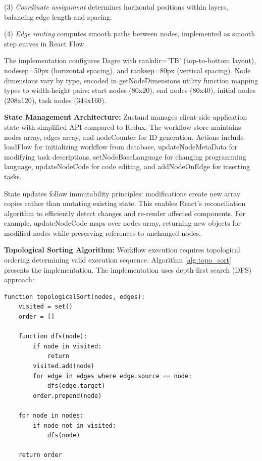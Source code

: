 \documentclass[12pt]{article}
\begin{document}
(3) \textit{Coordinate assignment} determines horizontal positions within layers, balancing edge length and spacing.

(4) \textit{Edge routing} computes smooth paths between nodes, implemented as smooth step curves in React Flow.

The implementation configures Dagre with rankdir='TB' (top-to-bottom layout), nodesep=50px (horizontal spacing), and ranksep=80px (vertical spacing). Node dimensions vary by type, encoded in getNodeDimensions utility function mapping types to width-height pairs: start nodes (80x20), end nodes (80x40), initial nodes (208x120), task nodes (344x160).

\hspace{\parindent}\textbf{State Management Architecture:} Zustand manages client-side application state with simplified API compared to Redux. The workflow store maintains nodes array, edges array, and nodeCounter for ID generation. Actions include loadFlow for initializing workflow from database, updateNodeMetaData for modifying task descriptions, setNodeBaseLanguage for changing programming language, updateNodeCode for code editing, and addNodeOnEdge for inserting tasks.

State updates follow immutability principles: modifications create new array copies rather than mutating existing state. This enables React's reconciliation algorithm to efficiently detect changes and re-render affected components. For example, updateNodeCode maps over nodes array, returning new objects for modified nodes while preserving references to unchanged nodes.

\hspace{\parindent}\textbf{Topological Sorting Algorithm:} Workflow execution requires topological ordering determining valid execution sequence. Algorithm \ref{alg:topo_sort} presents the implementation. The implementation uses depth-first search (DFS) approach:

\begin{verbatim}
function topologicalSort(nodes, edges):
    visited = set()
    order = []
    
    function dfs(node):
        if node in visited:
            return
        visited.add(node)
        for edge in edges where edge.source == node:
            dfs(edge.target)
        order.prepend(node)
    
    for node in nodes:
        if node not in visited:
            dfs(node)
    
    return order
\end{verbatim}
\end{document}
